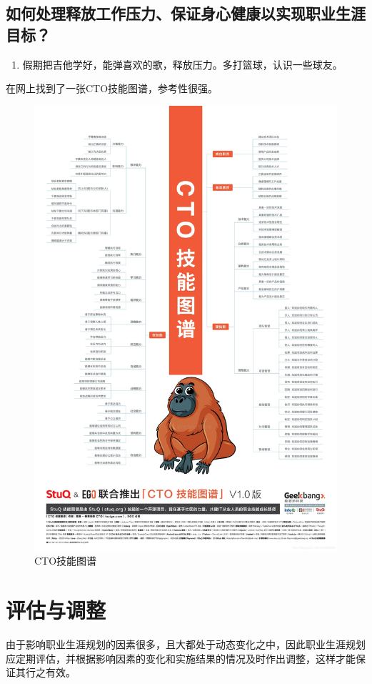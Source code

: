 \documentclass{article}
\begin{document}
 \subsection{ 如何处理释放工作压力、保证身心健康以实现职业生涯目标？}
\begin{enumerate}
	\item 假期把吉他学好，能弹喜欢的歌，释放压力。多打篮球，认识一些球友。
\end{enumerate}
在网上找到了一张CTO技能图谱，参考性很强。
\begin{figure}[H]
	\centering
	\includegraphics[width=1\linewidth]{skillmap}
	\caption{CTO技能图谱}
	\label{fig:skillmap}
\end{figure}
\section{评估与调整}
由于影响职业生涯规划的因素很多，且大都处于动态变化之中，因此职业生涯规划应定期评估，并根据影响因素的变化和实施结果的情况及时作出调整，这样才能保证其行之有效。\par 
\end{document}

